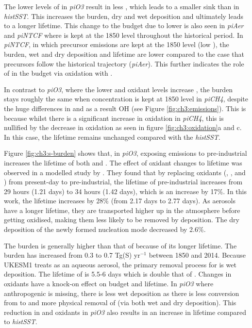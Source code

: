 The lower levels of  in \textit{piO3} result in less , which leads to a smaller  sink than in \textit{histSST}. This increases the  burden, dry and wet deposition and ultimately leads to a longer lifetime. This change to the  budget due to lower  is also seen in \textit{piAer} and \textit{piNTCF} where  is kept at the 1850 level throughout the historical period. In \textit{piNTCF}, in which  precursor emissions are kept at the 1850 level (low ), the  burden, wet and dry deposition and lifetime are lower compared to the case that  precursors follow the historical trajectory (\textit{piAer}). This further indicates the role of  in the  budget via oxidation with .


In contrast to \textit{piO3}, where the lower  and oxidant levels increase , the  burden stays roughly the same when  concentration is kept at 1850 level in \textit{piCH4}, despite the huge differences in  and as a result OH (see Figure \ref{fig:ch3:emissions}). This is because whilst there is a significant increase in  oxidation in \textit{piCH4}, this is nullified by the decrease in  oxidation as seen in figure \ref{fig:ch3:oxidation}a and c. In this case, the  lifetime remains unchanged compared with the \textit{histSST}.

Figure \ref{fig:ch3:s-burden} shows that, in \textit{piO3}, exposing  emissions to pre-industrial  increases the lifetime of both  and . The effect of oxidant changes to  lifetime was observed in a modelled study by \citep{karsetStrongImpactsAerosol2018}. They found that by replacing oxidants (, ,  and ) from present-day to pre-industrial, the lifetime of pre-industrial  increases from 29 hours (1.21 days) to 34 hours (1.42 days), which is an increase by 17\%. In this work, the  lifetime increases by 28\% (from 2.17 days to 2.77 days). As aerosols have a longer lifetime, they are transported higher up in the atmosphere before getting oxidised, making them less likely to be removed by deposition. The dry deposition of the newly formed nucleation mode  decreased by 2.6\%. 

The  burden is generally higher than that of  because of its longer lifetime. The  burden has increased from 0.3 to 0.7 Tg(S) yr$^{-1}$ between 1850 and 2014. Because UKESM1 treats  as an aqueous aerosol, the primary removal process for  is wet deposition. The lifetime of  is 5.5-6 days which is double that of . Changes in oxidants have a knock-on effect on  budget and lifetime. In \textit{piO3} where anthropogenic  is missing, there is less  wet deposition as there is less conversion from  to  and more physical removal of  (via both wet and dry deposition). This reduction in  and oxidants in \textit{piO3} also results in an increase in  lifetime compared to \textit{histSST}. 


